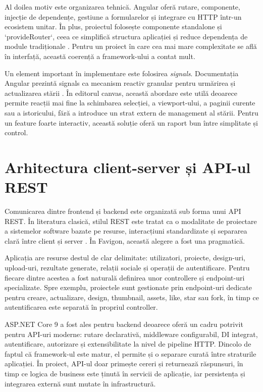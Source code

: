 Al doilea motiv este organizarea tehnică. Angular oferă rutare, componente, injecție de dependențe, gestiune a formularelor și integrare cu HTTP într-un ecosistem unitar. În plus, proiectul folosește componente standalone și `provideRouter`, ceea ce simplifică structura aplicației și reduce dependența de module tradiționale \cite{angularDocs2026}. Pentru un proiect în care cea mai mare complexitate se află în interfață, această coerență a framework-ului a contat mult.

Un element important în implementare este folosirea \textit{signals}. Documentația Angular prezintă signals ca mecanism reactiv granular pentru urmărirea și actualizarea stării \cite{angularDocs2026}. În editorul canvas, această abordare este utilă deoarece permite reacții mai fine la schimbarea selecției, a viewport-ului, a paginii curente sau a istoricului, fără a introduce un strat extern de management al stării. Pentru un feature foarte interactiv, această soluție oferă un raport bun între simplitate și control.

\section{Arhitectura client-server și API-ul REST}

Comunicarea dintre frontend și backend este organizată sub forma unui API REST. În literatura clasică, stilul REST este tratat ca o modalitate de proiectare a sistemelor software bazate pe resurse, interacțiuni standardizate și separarea clară între client și server \cite{fielding2000rest}. În Favigon, această alegere a fost una pragmatică.

Aplicația are resurse destul de clar delimitate: utilizatori, proiecte, design-uri, upload-uri, rezultate generate, relații sociale și operații de autentificare. Pentru fiecare dintre acestea a fost naturală definirea unor controllere și endpoint-uri specializate. Spre exemplu, proiectele sunt gestionate prin endpoint-uri dedicate pentru creare, actualizare, design, thumbnail, assets, like, star sau fork, în timp ce autentificarea este separată în propriul controller.

ASP.NET Core 9 a fost ales pentru backend deoarece oferă un cadru potrivit pentru API-uri moderne: rutare declarativă, middleware configurabil, DI integrat, autentificare, autorizare și extensibilitate la nivel de pipeline HTTP. Dincolo de faptul că framework-ul este matur, el permite și o separare curată între straturile aplicației. În proiect, API-ul doar primește cereri și returnează răspunsuri, în timp ce logica de business este ținută în servicii de aplicație, iar persistența și integrarea externă sunt mutate în infrastructură.

